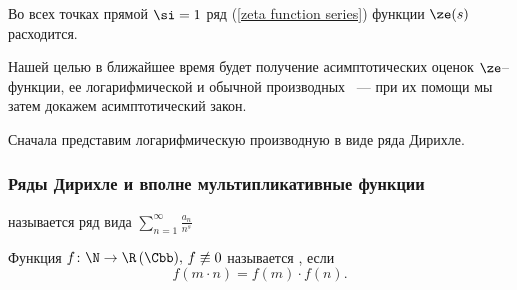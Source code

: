 \begin{problem}
  Во всех точках прямой $\si=1$ ряд (\ref{zeta function series}) функции $\ze(s)$ расходится.
\end{problem}

Нашей целью в ближайшее время будет получение асимптотических оценок $\ze$--\,функции, 
ее логарифмической и обычной производных ~— при их помощи мы затем докажем асимптотический закон.

Сначала представим логарифмическую производную в виде ряда Дирихле.

\subsubsection{Ряды Дирихле и вполне мультипликативные функции}

\begin{df}
   называется ряд вида
  \begin{math}
    \sum\limits_{n=1}^{\infty} \frac{a_n}{n^s}
  \end{math}
\end{df}

\begin{df}
  Функция $f\colon\N\rightarrow\R\,(\Cbb),\,f\not\equiv0$ называется , если
  $$
    f(m\cdot n)=f(m)\cdot f(n).
  $$
\end{df}

